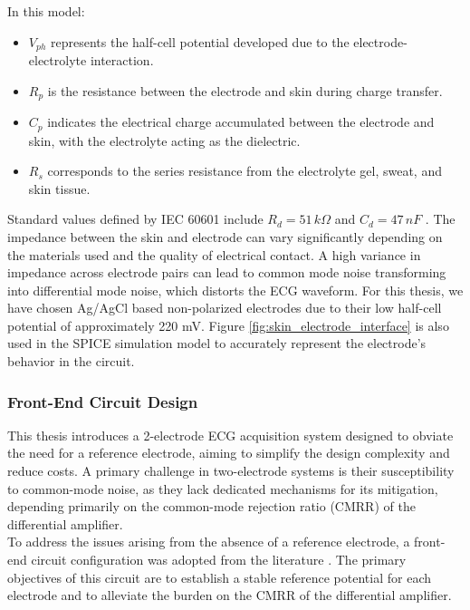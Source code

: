 		
		In this model:
		\begin{itemize}
			\item \(V_{ph}\) represents the half-cell potential developed due to the electrode-electrolyte interaction.
			\item \(R_p\) is the resistance between the electrode and skin during charge transfer.
			\item \(C_p\) indicates the electrical charge accumulated between the electrode and skin, with the electrolyte acting as the dielectric.
			\item \(R_s\) corresponds to the series resistance from the electrolyte gel, sweat, and skin tissue.
		\end{itemize}
		Standard values defined by IEC 60601 include \(R_d = 51\,k\Omega\) and \(C_d = 47\,nF\) \cite{Almeida_2021}. The impedance between the skin and electrode can vary significantly depending on the materials used and the quality of electrical contact. A high variance in impedance across electrode pairs can lead to common mode noise transforming into differential mode noise, which distorts the ECG waveform. For this thesis, we have chosen Ag/AgCl based non-polarized electrodes due to their low half-cell potential of approximately 220 mV. Figure \ref{fig:skin_electrode_interface} is also used in the SPICE simulation model to accurately represent the electrode's behavior in the circuit.


\subsubsection{Front-End Circuit Design}
\vspace{1em}
This thesis introduces a 2-electrode ECG acquisition system designed to obviate the need for a reference electrode, aiming to simplify the design complexity and reduce costs. A primary challenge in two-electrode systems is their susceptibility to common-mode noise, as they lack dedicated mechanisms for its mitigation, depending primarily on the common-mode rejection ratio (CMRR) of the differential amplifier.\\

\noindent To address the issues arising from the absence of a reference electrode, a front-end circuit configuration was adopted from the literature \cite{Dobrev_2008}. The primary objectives of this circuit are to establish a stable reference potential for each electrode and to alleviate the burden on the CMRR of the differential amplifier.\\

